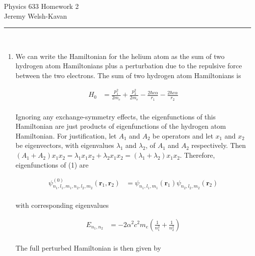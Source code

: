 \documentclass[]{article}
\begin{document}
{\Large Physics 633 Homework 2}\\
{Jeremy Welsh-Kavan}\\
\vspace{0.2 cm}
\noindent\rule{15cm}{0.4pt} \\

\begin{enumerate}[1)]

\item
We can write the Hamiltonian for the helium atom as the sum of two hydrogen atom Hamiltonians plus a perturbation due to the repulsive force between the two electrons. The sum of two hydrogen atom Hamiltonians is

\begin{equation}
\begin{split}
H_0 & = \frac{p_1^2}{2m_e} + \frac{p_2^2}{2m_e} - \frac{2\hbar c\alpha}{r_1} - \frac{2\hbar c\alpha}{r_2} \\
\end{split}
\end{equation}

Ignoring any exchange-symmetry effects, the eigenfunctions of this Hamiltonian are just products of eigenfunctions of the hydrogen atom Hamiltonian. For justification, let $A_1$ and $A_2$ be operators and let $x_1$ and $x_2$ be eigenvectors, with eigenvalues $\lambda_1$ and $\lambda_2$, of $A_1$ and $A_2$ respectively. Then $(A_1 + A_2)x_1x_2 = \lambda_1x_1x_2 + \lambda_2x_1x_2 = (\lambda_1 + \lambda_2)x_1x_2$. Therefore, eigenfunctions of (1) are

\begin{equation}
\begin{split}
\psi^{(0)}_{n_1,l_1,m_1,n_2,l_2,m_2}(\bm{r}_1,\bm{r}_2) & = \psi_{n_1,l_1,m_1}(\bm{r}_1)\psi_{n_2,l_2,m_2}(\bm{r}_2)  \\
\end{split}
\end{equation}

with corresponding eigenvalues

\begin{equation}
\begin{split}
E_{n_1,n_2} & = - 2\alpha^2c^2m_e \left( \frac{1}{n_1^2}  + \frac{1}{n_2^2}  \right) \\
\end{split}
\end{equation}

The full perturbed Hamiltonian is then given by


\end{enumerate}
\end{document}
